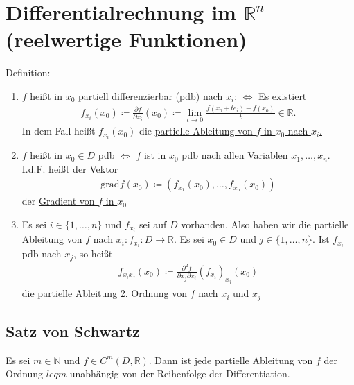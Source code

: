 \section{Differentialrechnung im $\mathbb{R}^n$ (reelwertige Funktionen)}
Definition:
\begin{enumerate}
    \item $f$ heißt in $x_0$ partiell differenzierbar (pdb) nach $x_i$: $\Leftrightarrow$
    Es existiert 
    \begin{align*}
        f_{x_i}(x_0) \coloneqq \frac{\partial f}{\partial x_i}(x_0) \coloneqq \lim \limits_{t \to 0} \frac{f(x_0 + te_i) - f(x_0)}{t} \in \mathbb{R}.
    \end{align*}
    In dem Fall heißt $f_{x_i}(x_0)$ die \underline{partielle Ableitung von $f$ in $x_0$ nach $x_i$.}
    \item $f$ heißt in $x_0 \in D$ pdb $\Leftrightarrow$ $f$ ist in $x_0$ pdb nach allen Variablen $x_1,\ldots,x_n$.
    I.d.F. heißt der Vektor
    \begin{align*}
        \text{grad} f(x_0) \coloneqq (f_{x_1}(x_0),\ldots,f_{x_n}(x_0))
    \end{align*}
    der \underline{Gradient von $f$ in $x_0$}
    \item Es sei $i \in \{1,\ldots,n\}$ und $f_{x_i}$ sei auf $D$ vorhanden. Also haben wir die partielle Ableitung von $f$ nach $x_i: f_{x_i}: D \to \mathbb{R}$.
    Es sei $x_0 \in D$ und $j \in \{1, \ldots,n \}$. Ist $f_{x_i}$ pdb nach $x_j$, so heißt
    \begin{align*}
        f_{x_ix_j}(x_0) \coloneqq \frac{\partial^2 f}{\partial x_j \partial x_i} (f_{x_i})_{x_j}(x_0)
    \end{align*}
    \underline{die partielle Ableitung 2. Ordnung von $f$ nach $x_i$ und $x_j$}
\end{enumerate}

\subsection{Satz von Schwartz}
\label{sec: Schwartz}
Es sei $m \in \mathbb{N}$ und $f \in C^m(D,\mathbb{R})$. Dann ist jede partielle Ableitung von $f$ der Ordnung $leq m$
unabhängig von der Reihenfolge der Differentiation.

